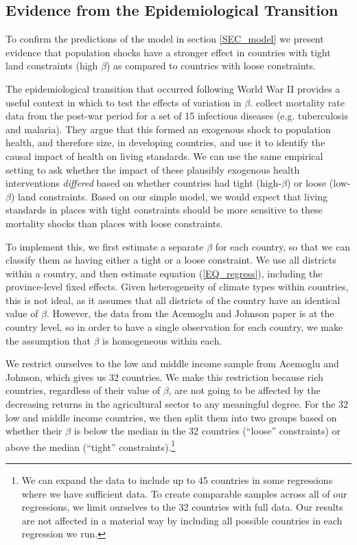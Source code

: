 \documentclass[11pt]{article}
\begin{document}
\subsection{Evidence from the Epidemiological Transition}\label{SEC_ajtest}
To confirm the predictions of the model in section \ref{SEC_model} we present evidence that population shocks have a stronger effect in countries with tight land constraints (high $\beta$) as compared to countries with loose constraints.

The epidemiological transition that occurred following World War II provides a useful context in which to test the effects of variation in $\beta$. \cite{aj07} collect mortality rate data from the post-war period for a set of 15 infectious diseases (e.g. tuberculosis and malaria). They argue that this formed an exogenous shock to population health, and therefore size, in developing countries, and use it to identify the causal impact of health on living standards. We can use the same empirical setting to ask whether the impact of these plausibly exogenous health interventions \textit{differed} based on whether countries had tight (high-$\beta$) or loose (low-$\beta$) land constraints. Based on our simple model, we would expect that living standards in places with tight constraints should be more sensitive to these mortality shocks than places with loose constraints.

To implement this, we first estimate a separate $\beta$ for each country, so that we can classify them as having either a tight or a loose constraint. We use all districts within a country, and then estimate equation (\ref{EQ_regress}), including the province-level fixed effects. Given heterogeneity of climate types within countries, this is not ideal, as it assumes that all districts of the country have an identical value of $\beta$. However, the data from the Acemoglu and Johnson paper is at the country level, so in order to have a single observation for each country, we make the assumption that $\beta$ is homogeneous within each.

We restrict ourselves to the low and middle income sample from Acemoglu and Johnson, which gives us 32 countries. We make this restriction because rich countries, regardless of their value of $\beta$, are not going to be affected by the decreasing returns in the agricultural sector to any meaningful degree. For the 32 low and middle income countries, we then split them into two groups based on whether their $\beta$ is below the median in the 32 countries (``loose'' constraints) or above the median (``tight'' constraints).\footnote{We can expand the data to include up to 45 countries in some regressions where we have sufficient data. To create comparable samples across all of our regressions, we limit ourselves to the 32 countries with full data. Our results are not affected in a material way by including all possible countries in each regression we run.}
\end{document}
